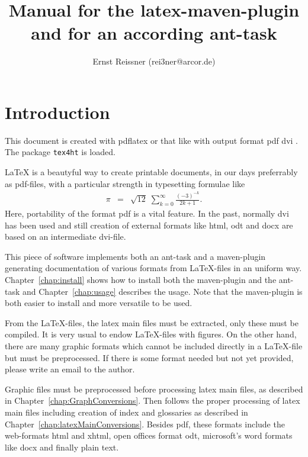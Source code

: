 \documentclass[12pt]{book}
\title{Manual for the latex-maven-plugin and for an according ant-task }
\author{Ernst Reissner (rei3ner@arcor.de)}
\newcommand{\gls}[1]{#1}
\begin{document}
\maketitle

\tableofcontents
\listoffigures
\listoftables


\chapter{Introduction}

This document is created with pdflatex or that like 
with output format 
\ifpdf
pdf%
\else
dvi%
\fi.
The package {\tt tex4ht} is  loaded. 

\LaTeX{} is a beautyful way to create printable documents, 
in our days preferrably as \gls{pdf}-files, 
with a particular strength in typesetting formulae like 
%
\begin{eqnarray*}
\pi & = & \sqrt{12}\;\sum^\infty_{k=0} \frac{(-3)^{-k}}{2k+1}. 
\end{eqnarray*}
%
Here, portability of the format \gls{pdf} is a vital feature. 
In the past, normally \gls{dvi} has been used 
and still creation of external formats like \gls{html}, 
\gls{odt} and \gls{docx} are based on an intermediate \gls{dvi}-file. 

This piece of software implements both an ant-task and a maven-plugin 
generating documentation of various formats from \LaTeX-files 
in an uniform way. 
Chapter~\ref{chap:install} shows how to install both the maven-plugin 
and the ant-task 
and Chapter~\ref{chap:usage} describes the usage. 
Note that the maven-plugin is both easier to install 
and more versatile to be used. 

From the \LaTeX-files, the latex main files must be extracted, 
only these must be compiled. 
It is very usual to endow \LaTeX-files with figures. 
On the other hand, there are many graphic formats 
which cannot be included directly in a \LaTeX-file 
but must be preprocessed. 
If there is some format needed but not yet provided, 
please write an email to the author. 

Graphic files must be preprocessed before processing latex main files, 
as described in Chapter~\ref{chap:GraphConversions}. 
Then follows the proper processing of latex main files 
including creation of index and glossaries 
as described in Chapter~\ref{chap:latexMainConversions}. 
Besides \gls{pdf}, these formats include the web-formats \gls{html} 
and \gls{xhtml}, 
open offices format \gls{odt}, microsoft's word formats like \gls{docx} 
and finally plain text. 
\end{document}
